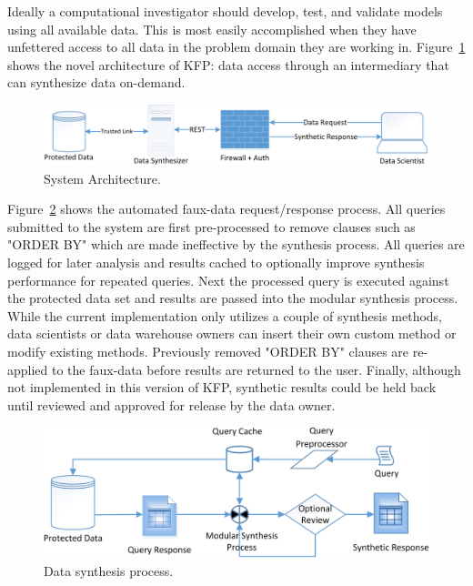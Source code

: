 \documentclass{amia}
\begin{document}
Ideally a computational investigator should develop, test, and validate models using all available data. This is most easily accomplished when they have unfettered access to all data in the problem domain they are working in. Figure~\ref{fig:architecture} shows the novel architecture of KFP: data access through an intermediary that can synthesize data on-demand.

\begin{figure}[ht]
  \centering
  \includegraphics[width=\textwidth]{prototype_architecture}
  \caption{System Architecture.}
  \label{fig:architecture}
\end{figure}

Figure~\ref{fig:synthesis_process} shows the automated faux-data request/response process. All queries submitted to the system are first pre-processed to remove clauses such as "ORDER BY" which are made ineffective by the synthesis process. All queries are logged for later analysis and results cached to optionally improve synthesis performance for repeated queries. Next the processed query is executed against the protected data set and results are passed into the modular synthesis process. While the current implementation only utilizes a couple of synthesis methods, data scientists or data warehouse owners can insert their own custom method or modify existing methods. Previously removed "ORDER BY" clauses are re-applied to the faux-data before results are returned to the user. Finally, although not implemented in this version of KFP, synthetic results could be held back until reviewed and approved for release by the data owner.

\begin{figure}[ht]
  \centering
  \includegraphics[width=120mm]{data_synthesis_process}
  \caption{Data synthesis process.}
  \label{fig:synthesis_process}
\end{figure}
\end{document}
